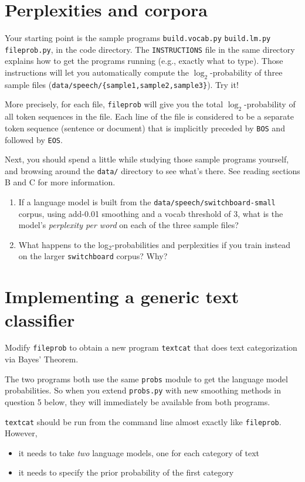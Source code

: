 \documentclass[12pt]{article}
\theoremstyle{plain}
\theoremstyle{definition}
\theoremstyle{remark}
\begin{document}
\newpage
\section{Perplexities and corpora}
Your starting point is the sample programs \texttt{build.vocab.py} \texttt{build.lm.py} \texttt{fileprob.py}, in the code directory. The \texttt{INSTRUCTIONS} file in the same directory explains how to get the programs running (e.g., exactly what to type). Those instructions will let you automatically compute the $\log_2$-probability of three sample files (\texttt{data/speech/\{sample1,sample2,sample3\}}). Try it!

More precisely, for each file, \texttt{fileprob} will give you the total $\log_2$-probability of all token sequences in the file. Each line of the file is considered to be a separate token sequence (sentence or document) that is implicitly preceded by \texttt{BOS} and followed by \texttt{EOS}.

Next, you should spend a little while studying those sample programs yourself, and browsing around the \texttt{data/} directory to see what’s there. See reading sections B and C for more information.

\begin{enumerate}[label=\reflectbox{\textifsymbol{34}}\arabic*]
    \item If a language model is built from the \texttt{data/speech/switchboard-small} corpus, using add-0.01 smoothing and a vocab threshold of 3, what is the model’s \textit{perplexity per word} on each of the three sample files?
    \item What happens to the log$_2$-probabilities and perplexities if you train instead on the larger \texttt{switchboard} corpus? Why?
\end{enumerate}

\newpage
\section{Implementing a generic text classifier}
Modify \texttt{fileprob} to obtain a new program \texttt{textcat} that does text categorization via Bayes’ Theorem.

The two programs both use the same \texttt{probs} module to get the language model probabilities. So when you extend \texttt{probs.py} with new smoothing methods in question 5 below, they will immediately be available from both programs.

\texttt{textcat} should be run from the command line almost exactly like \texttt{fileprob}. However,
\begin{itemize}
    \item it needs to take \textit{two} language models, one for each category of text
    \item it needs to specify the prior probability of the first category
\end{itemize}
\end{document}

